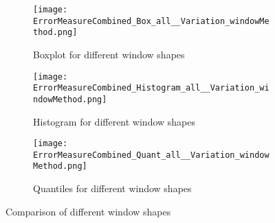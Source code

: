 \begin{figure}[htb!]
\centering
\begin{subfigure}[b]{0.45\textwidth}
\texttt{[image: ErrorMeasureCombined\_Box\_all\_\_Variation\_windowMethod.png]}
\caption{Boxplot for different window shapes}
\label{fig:window methods Box}
\end{subfigure}
\hfill
\begin{subfigure}[b]{0.45\textwidth}
\texttt{[image: ErrorMeasureCombined\_Histogram\_all\_\_Variation\_windowMethod.png]}
\caption{Histogram for different window shapes}
\label{fig:window methods Hist}
\end{subfigure}
\hfill
\begin{subfigure}[b]{0.8\textwidth}
\texttt{[image: ErrorMeasureCombined\_Quant\_all\_\_Variation\_windowMethod.png]}
\caption{Quantiles for different window shapes}
\label{fig:window methods Quant}
\end{subfigure}
\caption{Comparison of different window shapes}
\label{fig:window methods Comp1}
\end{figure}
